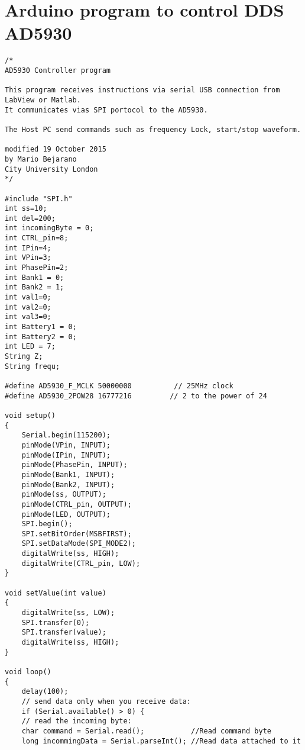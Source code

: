 
\chapter{Arduino program to control DDS AD5930}
\label{Appendix: Arduino}

\lstset{language=Arduino} 
\begin{lstlisting}
/*
AD5930 Controller program

This program receives instructions via serial USB connection from LabView or Matlab.
It communicates vias SPI portocol to the AD5930.

The Host PC send commands such as frequency Lock, start/stop waveform.

modified 19 October 2015
by Mario Bejarano
City University London
*/

#include "SPI.h"
int ss=10;
int del=200;
int incomingByte = 0;
int CTRL_pin=8;
int IPin=4;
int VPin=3;
int PhasePin=2;
int Bank1 = 0;
int Bank2 = 1;
int val1=0;
int val2=0;
int val3=0;
int Battery1 = 0;
int Battery2 = 0;
int LED = 7;
String Z;
String frequ;

#define AD5930_F_MCLK 50000000          // 25MHz clock
#define AD5930_2POW28 16777216         // 2 to the power of 24

void setup()
{
	Serial.begin(115200);
	pinMode(VPin, INPUT);
	pinMode(IPin, INPUT);
	pinMode(PhasePin, INPUT);
	pinMode(Bank1, INPUT);
	pinMode(Bank2, INPUT);
	pinMode(ss, OUTPUT);
	pinMode(CTRL_pin, OUTPUT);
	pinMode(LED, OUTPUT);
	SPI.begin();
	SPI.setBitOrder(MSBFIRST); 
	SPI.setDataMode(SPI_MODE2);
	digitalWrite(ss, HIGH);
	digitalWrite(CTRL_pin, LOW);
}

void setValue(int value)
{
	digitalWrite(ss, LOW);
	SPI.transfer(0);
	SPI.transfer(value);
	digitalWrite(ss, HIGH);
}

void loop()
{
	delay(100);
	// send data only when you receive data:
	if (Serial.available() > 0) {
	// read the incoming byte:
	char command = Serial.read();           //Read command byte
	long incommingData = Serial.parseInt(); //Read data attached to it
	

\end{lstlisting}
